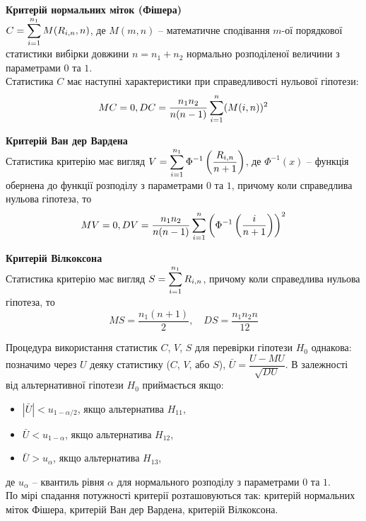 \textbf{Критерій нормальних міток (Фішера)} \\

$C = \displaystyle\sum\limits_{i=1}^{n_1} M(R_{i, n}, n)$, де $M(m, n)$ -- математичне сподівання $m$-ої порядкової статистики вибірки довжини $n = n_1 + n_2$ нормально розподіленої величини з параметрами $0$ та $1$. \\

Статистика $C$ має наступні характеристики при справедливості нульової гіпотези:
\[ M C = 0, D C = \dfrac{n_1 n_2}{n(n-1)} \displaystyle\sum\limits_{i=1}^n (M(i, n))^2 \]

\textbf{Критерій Ван дер Вардена} \\

Статистика критерію має вигляд $ V = \displaystyle\sum\limits_{i=1}^{n_1} \Phi^{-1} \left( \dfrac{R_{i,n}}{n+1} \right)$, де $\Phi^{-1}(x)$ -- функція обернена до функції розподілу з параметрами $0$ та $1$, причому коли справедлива нульова гіпотеза, то
\[ M V = 0, DV = \dfrac{n_1 n_2}{n(n-1)} \displaystyle\sum\limits_{i=1}^n \left( \Phi^{-1} \left( \dfrac{i}{n+1} \right) \right)^2 \]

\textbf{Критерій Вілкоксона} \\

Статистика критерію має вигляд $S = \displaystyle\sum\limits_{i=1}^{n_1} R_{i,n}$, причому коли справедлива нульова гіпотеза, то
\[ MS = \dfrac{n_1(n + 1)}{2}, \quad DS = \dfrac{n_1 n_2 n}{12} \]

Процедура використання статистик $C$, $V$, $S$ для перевірки гіпотези $H_0$ однакова: позначимо через $U$ деяку статистику ($C$, $V$, або $S$), $\bar{U} = \dfrac{U - M U}{\sqrt{D U}}$. В залежності від альтернативної гіпотези $H_0$ приймається якщо:
\begin{itemize}
    \item $|\bar{U}| < u_{1 - \alpha / 2}$, якщо альтернатива $H_{11}$,
    
    \item $\bar{U} < u_{1 - \alpha}$, якщо альтернатива $H_{12}$,
    
    \item $\bar{U} > u_\alpha$, якщо альтернатива $H_{13}$,
\end{itemize}
де $u_\alpha$ -- квантиль рівня $\alpha$ для нормального розподілу з параметрами $0$ та $1$. \\

По мірі спадання потужності критерії розташовуються так: критерій нормальних міток Фішера, критерій Ван дер Вардена, критерій Вілкоксона. \\


